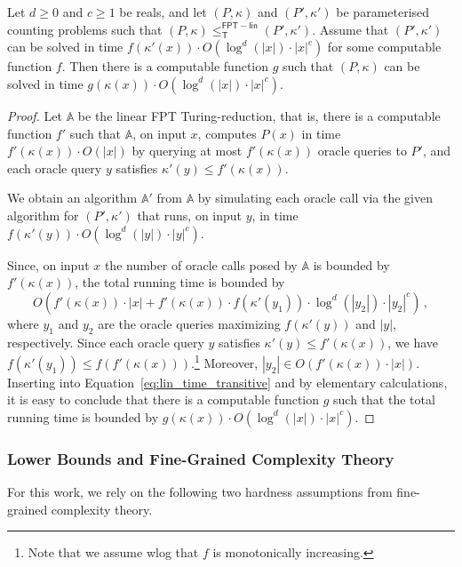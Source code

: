 \documentclass[authorcolumns,numberwithinsect]{no-lipics-v2022}
\newcommand{\fptlinred}{\leq^{\mathsf{FPT-lin}}_{\mathsf{T}}}
\begin{document}
\begin{lemma}
    Let $d\geq 0$ and $c\geq 1$ be reals, and let $(P,\kappa)$ and $(P',\kappa')$ be parameterised counting problems such that $(P,\kappa)\fptlinred (P',\kappa')$. Assume that $(P',\kappa')$ can be solved in time $f(\kappa'(x))\cdot O(\log^d(|x|)\cdot |x|^c)$ for some computable function $f$. Then there is a computable function $g$ such that $(P,\kappa)$ can be solved in time $g(\kappa(x))\cdot O(\log^d(|x|)\cdot |x|^c)$. 
\end{lemma}
\begin{proof}
    Let $\mathbb{A}$ be the linear FPT Turing-reduction, that is, there is a computable function $f'$ such that $\mathbb{A}$, on input $x$, computes $P(x)$ in time $f'(\kappa(x))\cdot O(|x|)$ by querying at most $f'(\kappa(x))$ oracle queries to $P'$, and each oracle query $y$ satisfies $\kappa'(y)\leq f'(\kappa(x))$.

    We obtain an algorithm $\mathbb{A}'$ from $\mathbb{A}$ by simulating each oracle call via the given algorithm for $(P',\kappa')$ that runs, on input $y$, in time  $f(\kappa'(y))\cdot O(\log^d(|y|)\cdot |y|^c)$. 
    
    Since, on input $x$ the number of oracle calls posed by $\mathbb{A}$ is bounded by $f'(\kappa(x))$, the total running time is bounded by
    \begin{equation}\label{eq:lin_time_transitive}
    O(f'(\kappa(x))\cdot |x| + f'(\kappa(x))\cdot f(\kappa'(y_1))\cdot \log^d(|y_2|)\cdot |y_2|^c) \,,
    \end{equation}
    where $y_1$ and $y_2$ are the oracle queries maximizing $f(\kappa'(y))$ and $|y|$, respectively. Since each oracle query $y$ satisfies $\kappa'(y)\leq f'(\kappa(x))$, we have $f(\kappa'(y_1)) \leq f(f'(\kappa(x)))$.\footnote{Note that we assume wlog that $f$ is monotonically increasing.} Moreover, $|y_2|\in O(f'(\kappa(x))\cdot |x|)$. Inserting into Equation~\ref{eq:lin_time_transitive} and by elementary calculations, it is easy to conclude that there is a computable function $g$ such that the total running time is bounded by $g(\kappa(x))\cdot O(\log^d(|x|)\cdot |x|^c)$. 
\end{proof}

\subsubsection{Lower Bounds and Fine-Grained Complexity Theory}\label{sec:prelims_fgct}
For this work, we rely on the following two hardness assumptions from fine-grained complexity theory.
\end{document}
